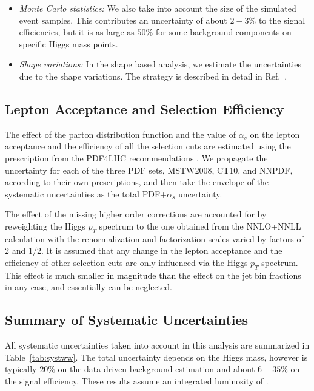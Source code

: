 \begin{itemize}
\item {\it Monte Carlo statistics:} We also take into account the 
size of the simulated event samples. 
This contributes an uncertainty of about $2-3\%$ to the signal
efficiencies, but it is as large as $50\%$ for some background components on specific
Higgs mass points.

\item {\it Shape variations:} In the shape based analysis, we estimate the 
uncertainties due to the shape variations. The strategy is described in detail in Ref.~\cite{shapeananote}.
\end{itemize}



\subsection{Lepton Acceptance and Selection Efficiency }

The effect of the parton distribution function and the value of $\alpha_{s}$
 on the lepton acceptance and the efficiency of all the selection cuts are 
estimated using the prescription from the PDF4LHC recommendations \cite{PDF4LHC}. We 
propagate the uncertainty for each of the three PDF sets, MSTW2008, CT10, and
NNPDF, according to their own prescriptions, and then take the envelope
of the systematic uncertainties as the total PDF+$\alpha_{s}$  uncertainty. 

The effect of the missing higher order corrections are accounted for by
reweighting the Higgs $p_{T}$ spectrum to the one obtained from the
NNLO+NNLL calculation with the renormalization and factorization scales
varied by factors of $2$ and $1/2$. It is assumed that any change in the
lepton acceptance and the efficiency of other selection cuts are only
influenced via the Higgs $p_{T}$ spectrum. This effect is much smaller in 
magnitude than the effect on the jet bin fractions in any case, and 
essentially can be neglected.



\subsection{Summary of Systematic Uncertainties}

All systematic uncertainties taken into account in this analysis
are summarized in Table~\ref{tab:systww}.
The total uncertainty depends on the Higgs mass, %
however is typically $20\%$ on the data-driven background estimation and about $6-35\%$ 
on the signal efficiency. These results assume an integrated luminosity of \intlumi. 

